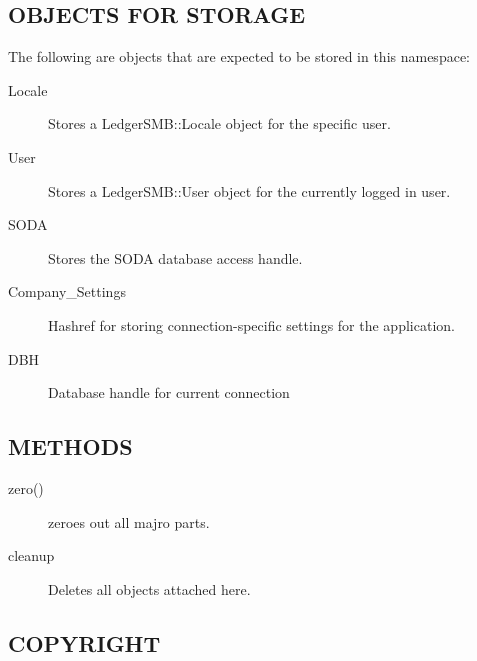 \begin{description}
\begin{description}
\begin{description}
\begin{description}
\begin{description}
\subsection*{OBJECTS FOR STORAGE\label{LedgerSMB::App_State_OBJECTS_FOR_STORAGE}}


The following are objects that are expected to be stored in this namespace:

\begin{description}

\item[{Locale}] \mbox{}

Stores a LedgerSMB::Locale object for the specific user.


\item[{User}] \mbox{}

Stores a LedgerSMB::User object for the currently logged in user.


\item[{SODA}] \mbox{}

Stores the SODA database access handle.


\item[{Company\_Settings}] \mbox{}

Hashref for storing connection-specific settings for the application.


\item[{DBH}] \mbox{}

Database handle for current connection

\end{description}
\subsection*{METHODS\label{LedgerSMB::App_State_METHODS}}
\begin{description}

\item[{zero()}] \mbox{}

zeroes out all majro parts.


\item[{cleanup}] \mbox{}

Deletes all objects attached here.

\end{description}
\subsection*{COPYRIGHT\label{LedgerSMB::App_State_COPYRIGHT}}



\end{description}
\end{description}
\end{description}
\end{description}
\end{description}
